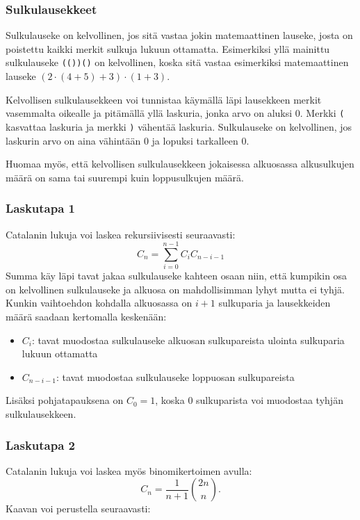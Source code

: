 \subsubsection{Sulkulausekkeet}

Sulkulauseke on kelvollinen,
jos sitä vastaa jokin
matemaattinen lauseke,
josta on poistettu
kaikki merkit sulkuja lukuun ottamatta.
Esimerkiksi yllä mainittu sulkulauseke \texttt{(())()}
on kelvollinen, koska sitä vastaa
esimerkiksi matemaattinen lauseke $(2 \cdot (4+5)+3)\cdot(1+3)$.

Kelvollisen sulkulausekkeen voi tunnistaa käymällä
läpi lausekkeen merkit vasemmalta oikealle ja
pitämällä yllä laskuria, jonka arvo on aluksi 0.
Merkki \texttt{(} kasvattaa laskuria ja
merkki \texttt{)} vähentää laskuria.
Sulkulauseke on kelvollinen, jos laskurin arvo
on aina vähintään 0 ja lopuksi tarkalleen 0.

Huomaa myös, että kelvollisen sulkulausekkeen
jokaisessa alkuosassa alkusulkujen määrä on
sama tai suurempi kuin loppusulkujen määrä.

\subsubsection{Laskutapa 1}

Catalanin lukuja voi laskea rekursiivisesti seuraavasti:
\[ C_n = \sum_{i=0}^{n-1} C_{i} C_{n-i-1}\]
Summa käy läpi tavat
jakaa sulkulauseke kahteen osaan niin,
että kumpikin osa on kelvollinen sulkulauseke
ja alkuosa on mahdollisimman lyhyt mutta ei tyhjä.
Kunkin vaihtoehdon kohdalla alkuosassa
on $i+1$ sulkuparia ja lausekkeiden määrä
saadaan kertomalla keskenään:

\begin{itemize}
\item $C_{i}$: tavat muodostaa sulkulauseke
alkuosan sulkupareista ulointa sulkuparia lukuun ottamatta
\item $C_{n-i-1}$: tavat muodostaa sulkulauseke
loppuosan sulkupareista
\end{itemize}
Lisäksi pohjatapauksena on $C_0=1$, koska 0
sulkuparista voi muodostaa
tyhjän sulkulausekkeen.

\subsubsection{Laskutapa 2}

Catalanin lukuja voi laskea myös binomikertoimen avulla:
\[ C_n = \frac{1}{n+1} {2n \choose n}. \]
Kaavan voi perustella seuraavasti:

